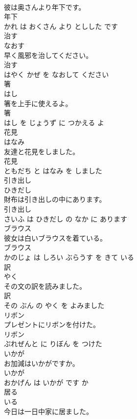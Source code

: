 \documentclass[8pt]{extreport}
\begin{document}
\begin{CJK}{UTF8}{min}
\\	彼は奥さんより年下です。	
\\	年下 
\\	かれ は おくさん より としした です			
\\	治す	
\\	なおす			
\\	早く風邪を治してください。	
\\	治す 
\\	はやく かぜ を なおして ください			
\\	箸	
\\	はし			
\\	箸を上手に使えるよ。	
\\	箸 
\\	はし を じょうず に つかえる よ			
\\	花見	
\\	はなみ			
\\	友達と花見をしました。	
\\	花見 
\\	ともだち と はなみ を しました			
\\	引き出し	
\\	ひきだし			
\\	財布は引き出しの中にあります。	
\\	引き出し 
\\	さいふ は ひきだし の なか に あります			
\\	ブラウス	
\\	彼女は白いブラウスを着ている。	
\\	ブラウス 
\\	かのじょ は しろい ぶらうす を きて いる			
\\	訳	
\\	やく			
\\	その文の訳を読みました。	
\\	訳 
\\	その ぶん の やく を よみました			
\\	リボン	
\\	プレゼントにリボンを付けた。	
\\	リボン 
\\	ぷれぜんと に りぼん を つけた			
\\	いかが	
\\	お加減はいかがですか。	
\\	いかが 
\\	おかげん は いかが です か			
\\	居る	
\\	いる			
\\	今日は一日中家に居ました。	

\end{CJK}
\end{document}

